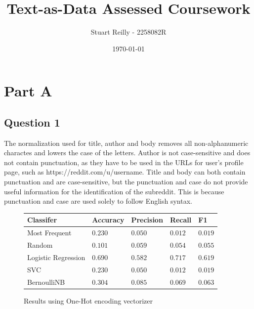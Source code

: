 \documentclass[10pt, a4paper]{article}
\begin{document}
\title{Text-as-Data Assessed Coursework}
\author{Stuart Reilly - 2258082R}
\date{\today}
\maketitle

\section{Part A}
\subsection{Question 1}

The normalization used for title, author and body removes all non-alphanumeric charactes and lowers the case of the letters.
Author is not case-sensitive and does not contain punctuation, as they have to be used in the URLs for user's profile page,
such as https://reddit.com/u/username.
Title and body can both contain punctuation and are case-sensitive, but the punctuation and case do not provide useful
information for the identification of the subreddit.
This is because punctuation and case are used solely to follow English syntax.

\begin{figure}[H]
	\caption{Results using One-Hot encoding vectorizer}
	\begin{center}
		\begin{tabulary}{\textwidth}{|L|L|L|L|L|}
			\hline
			Classifer           & Accuracy  & Precision & Recall    & F1        \\
			\hline
			Most Frequent       & \(0.230\) & \(0.050\) & \(0.012\) & \(0.019\) \\
			Random              & \(0.101\) & \(0.059\) & \(0.054\) & \(0.055\) \\
			Logistic Regression & \(0.690\) & \(0.582\) & \(0.717\) & \(0.619\) \\
			SVC                 & \(0.230\) & \(0.050\) & \(0.012\) & \(0.019\) \\
			BernoulliNB         & \(0.304\) & \(0.085\) & \(0.069\) & \(0.063\) \\
			\hline
		\end{tabulary}
	\end{center}
	\label{fig:one_hot}
\end{figure}
\end{document}
